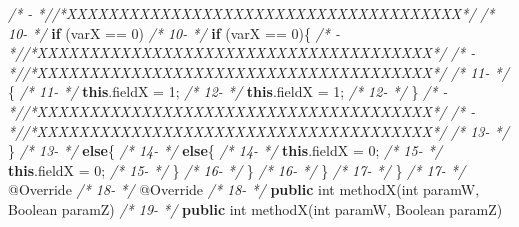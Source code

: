 \documentclass[
]{article}
\newenvironment{Shaded}{\begin{snugshade}}{\end{snugshade}}
\newcommand{\AttributeTok}[1]{\textcolor[rgb]{0.77,0.63,0.00}{#1}}
\newcommand{\BuiltInTok}[1]{#1}
\newcommand{\CommentTok}[1]{\textcolor[rgb]{0.56,0.35,0.01}{\textit{#1}}}
\newcommand{\DataTypeTok}[1]{\textcolor[rgb]{0.13,0.29,0.53}{#1}}
\newcommand{\DecValTok}[1]{\textcolor[rgb]{0.00,0.00,0.81}{#1}}
\newcommand{\FunctionTok}[1]{\textcolor[rgb]{0.00,0.00,0.00}{#1}}
\newcommand{\KeywordTok}[1]{\textcolor[rgb]{0.13,0.29,0.53}{\textbf{#1}}}
\newcommand{\NormalTok}[1]{#1}
\begin{document}
\begin{landscape}
\begin{Shaded}
\begin{Highlighting}[]
\CommentTok{/*   -   *//*XXXXXXXXXXXXXXXXXXXXXXXXXXXXXXXXXXXXXX*/}               \CommentTok{/* 10-   */}        \KeywordTok{if}\NormalTok{ (varX == }\DecValTok{0}\NormalTok{)                                   }
\CommentTok{/* 10-   */}        \KeywordTok{if}\NormalTok{ (varX == }\DecValTok{0}\NormalTok{)\{                                  }\CommentTok{/*   -   *//*XXXXXXXXXXXXXXXXXXXXXXXXXXXXXXXXXXXXXX*/}               
\CommentTok{/*   -   *//*XXXXXXXXXXXXXXXXXXXXXXXXXXXXXXXXXXXXXX*/}               \CommentTok{/* 11-   */}\NormalTok{        \{                                                }
\CommentTok{/* 11-   */}            \KeywordTok{this}\NormalTok{.}\FunctionTok{fieldX}\NormalTok{ = }\DecValTok{1}\NormalTok{;                             }\CommentTok{/* 12-   */}            \KeywordTok{this}\NormalTok{.}\FunctionTok{fieldX}\NormalTok{ = }\DecValTok{1}\NormalTok{;                             }
\CommentTok{/* 12-   */}\NormalTok{        \}                                                }\CommentTok{/*   -   *//*XXXXXXXXXXXXXXXXXXXXXXXXXXXXXXXXXXXXXX*/}               
\CommentTok{/*   -   *//*XXXXXXXXXXXXXXXXXXXXXXXXXXXXXXXXXXXXXX*/}               \CommentTok{/* 13-   */}\NormalTok{        \}                                                            }
\CommentTok{/* 13-   */}        \KeywordTok{else}\NormalTok{\{                                            }\CommentTok{/* 14-   */}        \KeywordTok{else}\NormalTok{\{                                            }
\CommentTok{/* 14-   */}            \KeywordTok{this}\NormalTok{.}\FunctionTok{fieldX}\NormalTok{ = }\DecValTok{0}\NormalTok{;                             }\CommentTok{/* 15-   */}            \KeywordTok{this}\NormalTok{.}\FunctionTok{fieldX}\NormalTok{ = }\DecValTok{0}\NormalTok{;                             }
\CommentTok{/* 15-   */}\NormalTok{        \}                                                }\CommentTok{/* 16-   */}\NormalTok{        \}                                                }
\CommentTok{/* 16-   */}\NormalTok{    \}                                                    }\CommentTok{/* 17-   */}\NormalTok{    \}                                                    }
\CommentTok{/* 17-   */}    \AttributeTok{@Override}                                            \CommentTok{/* 18-   */}    \AttributeTok{@Override}                                            
\CommentTok{/* 18-   */}    \KeywordTok{public} \DataTypeTok{int} \FunctionTok{methodX}\NormalTok{(}\DataTypeTok{int}\NormalTok{ paramW, }\BuiltInTok{Boolean}\NormalTok{ paramZ)       }\CommentTok{/* 19-   */}    \KeywordTok{public} \DataTypeTok{int} \FunctionTok{methodX}\NormalTok{(}\DataTypeTok{int}\NormalTok{ paramW, }\BuiltInTok{Boolean}\NormalTok{ paramZ)       }

\end{Highlighting}
\end{Shaded}
\end{landscape}
\end{document}
